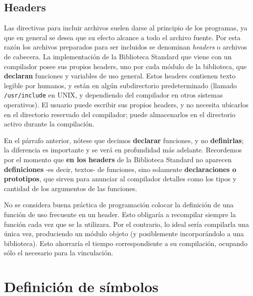 \subsection{Headers}
Las directivas para incluir archivos suelen darse al principio de los programas, ya que en general se desea que su efecto alcance a todo el archivo fuente. Por esta razón los archivos preparados para ser incluidos se denominan \textit{headers} o archivos de cabecera. La implementación de la Biblioteca Standard que viene con un compilador posee sus propios headers, uno por cada módulo de la biblioteca, que \textbf{declaran} funciones y variables de uso general. Estos headers contienen texto legible por humanos, y están en algún subdirectorio predeterminado (llamado \lstinline{/usr/include} en UNIX, y dependiendo del compilador en otros sistemas operativos). El usuario puede escribir sus propios headers, y no necesita ubicarlos en el directorio reservado del compilador; puede almacenarlos en el directorio activo durante la compilación. 

En el párrafo anterior, nótese que decimos \textbf{declarar} funciones, y no \textbf{definirlas}; la diferencia es importante y se verá en profundidad más adelante. Recordemos por el momento que \textbf{en los headers} de la Biblioteca Standard no aparecen \textbf{definiciones} -es decir, textos- de funciones, sino solamente \textbf{declaraciones o prototipos}, que sirven para anunciar al compilador detalles como los tipos y cantidad de los argumentos de las funciones.

No se considera buena práctica de programación colocar la definición de una función de uso frecuente en un header. Esto obligaría a recompilar siempre la función cada vez que se la utilizara. Por el contrario, lo ideal sería compilarla una única vez, produciendo un módulo objeto (y posiblemente incorporándolo a una biblioteca). Esto ahorraría el tiempo correspondiente a su compilación, ocupando
sólo el necesario para la vinculación.


\section{Definición de símbolos}

